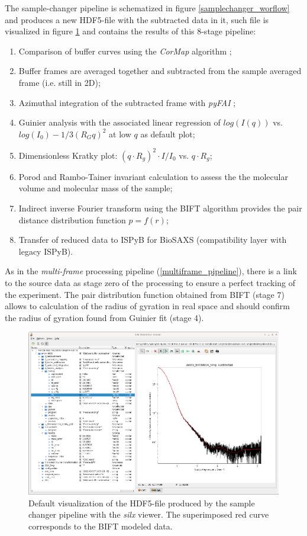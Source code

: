 \documentclass[preprint]{iucr}              %
\begin{document}
The sample-changer pipeline is schematized in figure \ref{samplechanger_worflow} and produces a new HDF5-file with the subtracted data in it, such file is visualized in figure \ref{subtracted} and contains the results of this 8-stage pipeline: 
\begin{enumerate}
    \item Comparison of buffer curves using the \textit{CorMap} algorithm \cite{CorMap};
    \item Buffer frames are averaged together and subtracted from the sample averaged frame (i.e. still in 2D);
    \item Azimuthal integration of the subtracted frame with \textit{pyFAI} \cite{pyfai_2020};
    \item Guinier analysis with the associated linear regression of $log(I(q))$ vs. $log(I_0)-1/3 (R_{G}q)^{2}$ at low $q$ as default plot;
    \item Dimensionless Kratky plot: $(q\cdot R_g)^2\cdot I/I_0$  vs. $q\cdot R_g$;
    \item Porod \cite{glatter+kratky} and Rambo-Tainer invariant \cite{RamboTainerNature2013} calculation to assess the the molecular volume and molecular mass of the sample;
    \item Indirect inverse Fourier transform using the BIFT algorithm \cite{bift} provides the pair distance distribution function $p=f(r)$;
    \item Transfer of reduced data to ISPyB for BioSAXS (compatibility layer with legacy ISPyB).
\end{enumerate}
As in the \textit{multi-frame} processing pipeline (\ref{multiframe_pipeline}), there is a link to the source data as stage zero of the processing to ensure a perfect tracking of the experiment.
The pair distribution function obtained from BIFT (stage 7) allows to calculation of the radius of gyration in real space and should confirm the radius of gyration found from Guinier fit (stage 4). 

\begin{figure}
    \label{subtracted}
    \includegraphics[width=12cm]{subtracted.eps}
    \caption{Default visualization of the HDF5-file produced by the sample changer pipeline with the \textit{silx} viewer. 
    The superimposed red curve corresponds to the BIFT modeled data.}
\end{figure}
\end{document}
